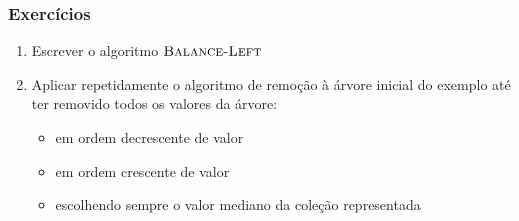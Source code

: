 \documentclass{beamer}
\begin{document}
\begin{frame}
\frametitle{Exercícios}

\begin{enumerate}
\item Escrever o algoritmo $\textnormal{\scshape Balance-Left}$
\item Aplicar repetidamente o algoritmo de remoção à árvore inicial do exemplo
  até ter removido todos os valores da árvore:
  \begin{itemize}
    \item em ordem decrescente de valor
    \item em ordem crescente de valor
    \item escolhendo sempre o valor mediano da coleção representada
  \end{itemize}
\end{enumerate}
\end{frame}
\end{document}
